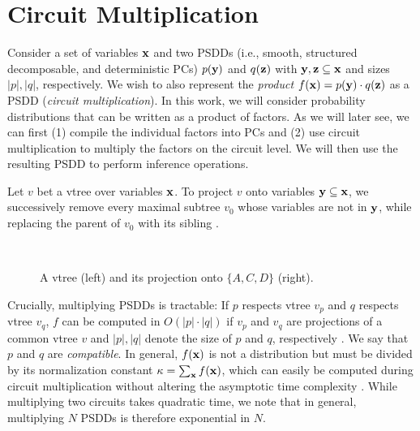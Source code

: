 \section{Circuit Multiplication}
\label{sec:trac_op}
Consider a set of variables $\mathbf{x}$ and two PSDDs (i.e., smooth, structured decomposable, and deterministic PCs) $p(\mathbf{y})$ and $q(\mathbf{z})$ with $\mathbf{y}, \mathbf{z} \subseteq \mathbf{x}$ and sizes $|p|, |q|$, respectively. We wish to also represent the \textit{product} $f(\mathbf{x}) = p(\mathbf{y}) \cdot q(\mathbf{z})$ as a PSDD (\textit{circuit multiplication}). In this work, we will consider probability distributions that can be written as a product of factors. As we will later see, we can first (1) compile the individual factors into PCs and (2) use circuit multiplication to multiply the factors on the circuit level. We will then use the resulting PSDD to perform inference operations.

\begin{definition}
    Let $v$ bet a vtree over variables $\mathbf{x}$. To project $v$ onto variables $\mathbf{y} \subseteq \mathbf{x}$, we successively remove every maximal subtree $v_0$ whose variables are not in $\mathbf{y}$, while replacing the parent of $v_0$ with its sibling \cite{sbn}.
\end{definition}

\begin{figure*}[ht!]
    \begin{subfigure}[t]{0.6\textwidth}
        \centering
        
    \end{subfigure}
    ~
    \begin{subfigure}[t]{0.4\textwidth}
        \vspace{-3.2cm}
        
    \end{subfigure}
    \caption{A vtree (left) and its projection onto $\{A,C,D\}$ (right).}
    \label{fig:vtree_projection}
\end{figure*}

Crucially, multiplying PSDDs is tractable: If $p$ respects vtree $v_p$ and $q$ respects vtree $v_q$, $f$ can be computed in $O(|p| \cdot |q|)$ if $v_p$ and $v_q$ are projections of a common vtree $v$ and $|p|, |q|$ denote the size of $p$ and $q$, respectively \cite{tractable_ops}. We say that $p$ and $q$ are \textit{compatible}. In general, $f(\mathbf{x})$ is not a distribution but must be divided by its normalization constant $\kappa = \sum_{\mathbf{x}} f(\mathbf{x})$, which can easily be computed during circuit multiplication without altering the asymptotic time complexity \cite{tractable_ops}.
While multiplying two circuits takes quadratic time, we note that in general, multiplying $N$ PSDDs is therefore exponential in $N$.

